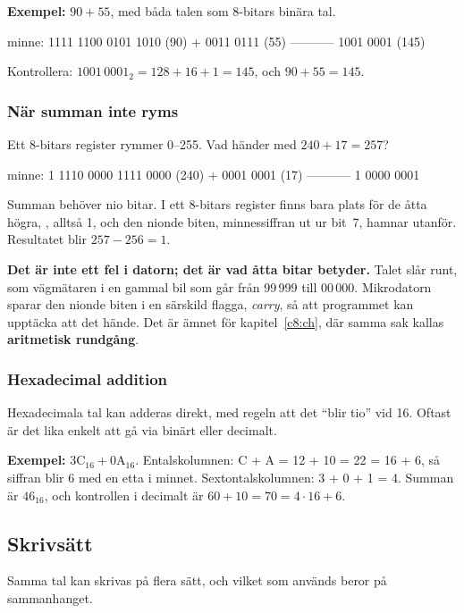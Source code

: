 \textbf{Exempel:} $90 + 55$, med båda talen som 8-bitars binära tal.

\begin{textdrawing}
  minne:   1111 1100
           0101 1010     (90)
         + 0011 0111     (55)
         -----------
           1001 0001     (145)
\end{textdrawing}

\noindent Kontrollera: $1001\,0001_2 = 128 + 16 + 1 = 145$, och $90 + 55 = 145$.

\subsubsection{När summan inte ryms}
Ett 8-bitars register rymmer 0--255. Vad händer med $240 + 17 = 257$?

\begin{textdrawing}
  minne: 1 1110 0000
           1111 0000     (240)
         + 0001 0001     (17)
         -----------
         1 0000 0001
\end{textdrawing}

\noindent Summan behöver nio bitar. I ett 8-bitars register finns bara plats för de åtta högra,
, alltså 1, och den nionde biten, minnessiffran ut ur bit~7, hamnar utanför.
Resultatet blir $257 - 256 = 1$.

\textbf{Det är inte ett fel i datorn; det är vad åtta bitar betyder.} Talet slår runt, som
vägmätaren i en gammal bil som går från 99\,999 till 00\,000. Mikrodatorn sparar den nionde biten
i en särskild flagga, \emph{carry}, så att programmet kan upptäcka att det hände. Det är ämnet för
kapitel~\ref{c8:ch}, där samma sak kallas \textbf{aritmetisk rundgång}.

\subsubsection{Hexadecimal addition}
Hexadecimala tal kan adderas direkt, med regeln att det \enquote{blir tio} vid 16. Oftast är det
lika enkelt att gå via binärt eller decimalt.

\textbf{Exempel:} $\text{3C}_{16} + \text{0A}_{16}$. Entalskolumnen: C + A = 12 + 10 = 22 = 16 + 6,
så siffran blir 6 med en etta i minnet. Sextontalskolumnen: 3 + 0 + 1 = 4. Summan är
$\text{46}_{16}$, och kontrollen i decimalt är $60 + 10 = 70 = 4 \cdot 16 + 6$.

\subsection{Skrivsätt}
\label{c1:a8}
Samma tal kan skrivas på flera sätt, och vilket som används beror på sammanhanget.

